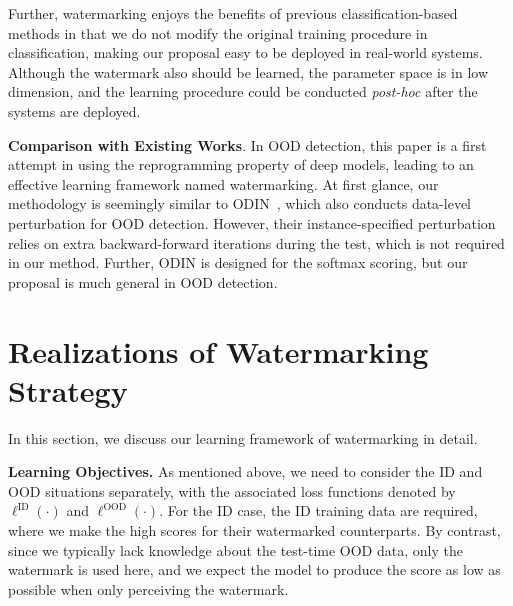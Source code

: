 \documentclass{article}
\begin{document}
Further, watermarking enjoys the benefits of previous classification-based methods in that we do not modify the original training procedure in classification, making our proposal easy to be deployed in real-world systems. Although the watermark also should be learned, the parameter space is in low dimension, and the learning procedure could be conducted \emph{post-hoc} after the systems are deployed. 




\textbf{Comparison with Existing Works}. In OOD detection, this paper is a first attempt in using the reprogramming property of deep models, leading to an effective learning framework named watermarking. At first glance, our methodology is seemingly similar to ODIN~\cite{LiangLS18}, which also conducts data-level perturbation for OOD detection. However, their instance-specified perturbation relies on extra backward-forward iterations during the test, which is not required in our method. Further, ODIN is designed for the softmax scoring, but our proposal is much general in OOD detection. 








































\section{Realizations of Watermarking Strategy} 

\label{sec: realization}

In this section, we discuss our learning framework of watermarking in detail. 

\textbf{Learning Objectives.}
As mentioned above, we need to consider the ID and OOD situations separately, with the associated loss functions denoted by $\ell^\text{ID}(\cdot)$ and $\ell^\text{OOD}(\cdot)$. For the ID case, the ID training data are required, where we make the high scores for their watermarked counterparts. By contrast, since we typically lack knowledge about the test-time OOD data, only the watermark is used here, and we expect the model to produce the score as low as possible when only perceiving the watermark. 
\end{document}
